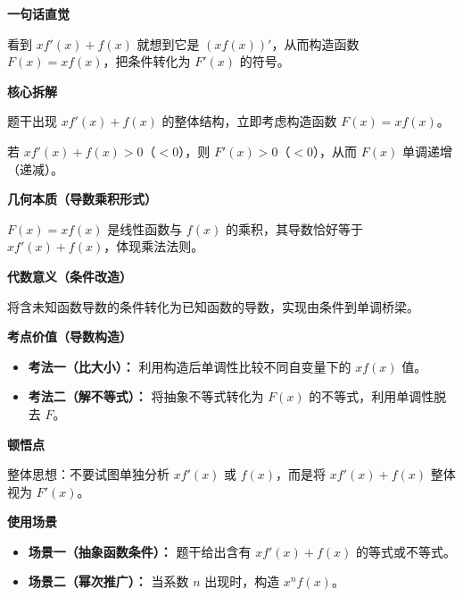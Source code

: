 \begin{explanationbox}

	\textbf{\textcolor{CExplanation}{一句话直觉}}

	看到 $x f'(x)+f(x)$ 就想到它是 $(x f(x))'$，从而构造函数 $F(x)=x f(x)$，把条件转化为 $F'(x)$ 的符号。

	\medskip
	\textbf{\textcolor{CExplanation}{核心拆解}}
	\begin{description}[style=nextline, leftmargin=2.8em, labelsep=0.5em, itemsep=0.45em]
		\item[\textbf{要点一（构造识别）：}] 题干出现 $x f'(x)+f(x)$ 的整体结构，立即考虑构造函数 $F(x)=x f(x)$。
		\item[\textbf{要点二（符号映射）：}] 若 $x f'(x)+f(x)>0$（$<0$），则 $F'(x)>0$（$<0$），从而 $F(x)$ 单调递增（递减）。
	\end{description}

	\medskip
	\textbf{\textcolor{CExplanation}{几何本质（导数乘积形式）}}

	$F(x)=x f(x)$ 是线性函数与 $f(x)$ 的乘积，其导数恰好等于 $x f'(x)+f(x)$，体现乘法法则。

	\medskip
	\textbf{\textcolor{CExplanation}{代数意义（条件改造）}}

	将含未知函数导数的条件转化为已知函数的导数，实现由条件到单调桥梁。

	\medskip
	\textbf{\textcolor{CExplanation}{考点价值（导数构造）}}
	\begin{itemize}[leftmargin=*, itemsep=0.5em, topsep=0.4em]
		\item \textbf{考法一（比大小）：} 利用构造后单调性比较不同自变量下的 $x f(x)$ 值。
		\item \textbf{考法二（解不等式）：} 将抽象不等式转化为 $F(x)$ 的不等式，利用单调性脱去 $F$。
	\end{itemize}

	\medskip
	\textbf{\textcolor{CExplanation}{顿悟点}}

	整体思想：不要试图单独分析 $x f'(x)$ 或 $f(x)$，而是将 $x f'(x)+f(x)$ 整体视为 $F'(x)$。

	\medskip
	\textbf{\textcolor{CExplanation}{使用场景}}
	\begin{itemize}[leftmargin=*, itemsep=0.5em, topsep=0.4em]
		\item \textbf{场景一（抽象函数条件）：} 题干给出含有 $x f'(x)+f(x)$ 的等式或不等式。
		\item \textbf{场景二（幂次推广）：} 当系数 $n$ 出现时，构造 $x^n f(x)$。
	\end{itemize}
\end{explanationbox}
